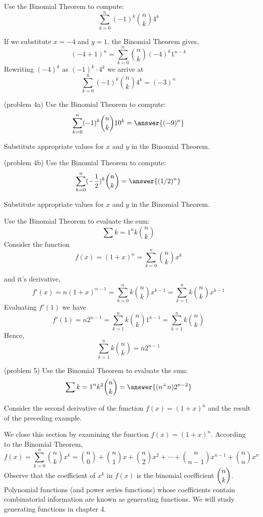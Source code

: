 \documentclass[handout]{ximera}
\begin{document}
\begin{example}[example 4]
Use the Binomial Theorem to compute:
\[
\sum_{k=0}^n (-1)^k\binom{n}{k}4^k 
\]

If we substitute $x=-4$ and $y=1$, the Binomial Theorem gives,
\[
(-4+1)^n = \sum_{k=0}^n \binom{n}{k} (-4)^k 1^{n-k}
\]
Rewriting $(-4)^k$ as $(-1)^k \cdot 4^k$ we arrive at
\[
\sum_{k=0}^n (-1)^k\binom{n}{k}4^k = (-3)^n
\]
\end{example}

\begin{problem}(problem 4a)
Use the Binomial Theorem to compute:
\[
\sum_{k=0}^n (-1)^k\binom{n}{k}10^k = \answer{(-9)^n}
\]
\begin{hint}
Substitute appropriate values for $x$ and $y$ in the Binomial Theorem.
\end{hint}

\end{problem}

\begin{problem}(problem 4b)
Use the Binomial Theorem to compute:
\[
\sum_{k=0}^n (-\frac12)^k\binom{n}{k} = \answer{(1/2)^n}
\]
\begin{hint}
Substitute appropriate values for $x$ and $y$ in the Binomial Theorem.
\end{hint}

\end{problem}

\begin{example}[example 5]
Use the Binomial Theorem to evaluate the sum:
\[
\sum{k=1}^{n} k\binom{n}{k}
\]
Consider the function 
\[
f(x) = (1+x)^n =\sum_{k=0}^n \binom{n}{k} x^k
\]

and it's derivative, 
\[
f'(x) = n(1+x)^{n-1}= \sum_{k=0}^n k\binom{n}{k} x^{k-1} = \sum_{k=1}^n k\binom{n}{k} x^{k-1}
\]
Evaluating $f'(1)$ we have
\[
f'(1) = n2^{n-1} = \sum_{k=1}^n k\binom{n}{k} 1^{k-1} = \sum_{k=1}^n k\binom{n}{k}
\]
Hence,
\[
\sum_{k=1}^n k\binom{n}{k} = n2^{n-1}
\]
\end{example}

\begin{problem}(problem 5)
Use the Binomial Theorem to evaluate the sum:
\[
 \sum{k=1}^n k^2 \binom {n}{k} = \answer{(n^+n)2^{n-2}}
\]
\begin{hint}
Consider the second derivative of the function $f(x) = (1+x)^n$ and the result of the preceding example.
\end{hint}

\end{problem}

We close this section by examining the function $f(x) = (1+x)^n$. According to the Binomial Theorem,
\[
f(x) = \sum_{k=0}^n \binom{n}{k} x^k = \binom{n}{0} + \binom{n}{1}x + \binom{n}{2}x^2 + \cdots + \binom{n}{n-1}x^{n-1} + \binom{n}{n}x^n
\]
Observe that the coefficient of $x^k$ in $f(x)$ is the binomial coefficient $\displaystyle \binom{n}{k}$. 
Polynomial functions (and power series functions) whose coefficients contain combinatorial 
information are known as generating functions.  We will study generating functions in chapter 4.

\end{document}
